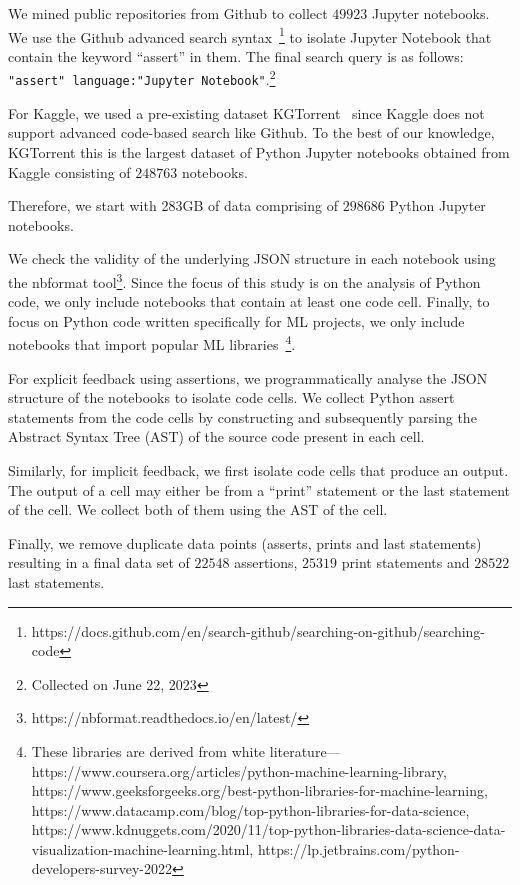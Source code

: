 We mined public repositories from Github to collect $49923$ Jupyter notebooks. We use the Github advanced search syntax~\footnote{https://docs.github.com/en/search-github/searching-on-github/searching-code} to isolate Jupyter Notebook that contain the keyword ``assert'' in them. The final search query is as follows: \texttt{"assert" language:"Jupyter Notebook"}.\footnote{Collected on June 22, 2023}

For Kaggle, we used a pre-existing dataset KGTorrent~\cite{quaranta2021kgtorrent} since Kaggle does not support advanced code-based search like Github. To the best of our knowledge, KGTorrent this is the largest dataset of Python Jupyter notebooks obtained from Kaggle consisting of $248763$ notebooks.

Therefore, we start with 283GB of data comprising of $298686$ Python Jupyter notebooks.

We check the validity of the underlying JSON structure in each notebook using the nbformat tool\footnote{https://nbformat.readthedocs.io/en/latest/}. Since the focus of this study is on the analysis of Python code, we only include notebooks that contain at least one code cell. Finally, to focus on Python code written specifically for ML projects, we only include notebooks that import popular ML libraries~\footnote{These libraries are derived from white literature---https://www.coursera.org/articles/python-machine-learning-library, https://www.geeksforgeeks.org/best-python-libraries-for-machine-learning, https://www.datacamp.com/blog/top-python-libraries-for-data-science, https://www.kdnuggets.com/2020/11/top-python-libraries-data-science-data-visualization-machine-learning.html, https://lp.jetbrains.com/python-developers-survey-2022}.

For explicit feedback using assertions, we programmatically analyse the JSON structure of the notebooks to isolate code cells. We collect Python assert statements from the code cells by constructing and subsequently parsing the Abstract Syntax Tree (AST) of the source code present in each cell.

Similarly, for implicit feedback, we first isolate code cells that produce an output. The output of a cell may either be from a ``print'' statement or the last statement of the cell. We collect both of them using the AST of the cell.

Finally, we remove duplicate data points (asserts, prints and last statements) resulting in a final data set of $22548$ assertions, $25319$ print statements and $28522$ last statements.


